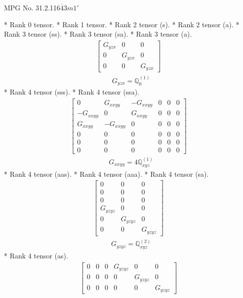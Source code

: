 \documentclass[fleqn,8pt,landscape]{jsarticle}
\begin{document}
\setcounter{MaxMatrixCols}{32}

\renewcommand{\tablename}{Table~}
\renewcommand{\figurename}{Figure~}
\begin{center}
\LARGE
MPG No. 31.2.116\quad$\bar{4}3m1'$
\end{center}
* Rank 0 tensor.
* Rank 1 tensor.
* Rank 2 tensor (s).
* Rank 2 tensor (a).
* Rank 3 tensor (ss).
* Rank 3 tensor (sa).
* Rank 3 tensor (a).
\begin{align*}
\begin{bmatrix} G_{yzx} & 0 & 0 \\ 0 & G_{yzx} & 0 \\ 0 & 0 & G_{yzx} \end{bmatrix}
\end{align*}
\begin{align*}
& G_{yzx} = \mathbb{Q}_{0}^{(1)}
\end{align*}
* Rank 4 tensor (sss).
* Rank 4 tensor (ssa).
\begin{align*}
\begin{bmatrix} 0 & G_{xxyy} & - G_{xxyy} & 0 & 0 & 0 \\ - G_{xxyy} & 0 & G_{xxyy} & 0 & 0 & 0 \\ G_{xxyy} & - G_{xxyy} & 0 & 0 & 0 & 0 \\ 0 & 0 & 0 & 0 & 0 & 0 \\ 0 & 0 & 0 & 0 & 0 & 0 \\ 0 & 0 & 0 & 0 & 0 & 0 \end{bmatrix}
\end{align*}
\begin{align*}
& G_{xxyy} = 4 \mathbb{Q}_{xyz}^{(1)}
\end{align*}
* Rank 4 tensor (aas).
* Rank 4 tensor (aaa).
* Rank 4 tensor (sa).
\begin{align*}
\begin{bmatrix} 0 & 0 & 0 \\ 0 & 0 & 0 \\ 0 & 0 & 0 \\ G_{yzyz} & 0 & 0 \\ 0 & G_{yzyz} & 0 \\ 0 & 0 & G_{yzyz} \end{bmatrix}
\end{align*}
\begin{align*}
& G_{yzyz} = \mathbb{Q}_{xyz}^{(2)}
\end{align*}
* Rank 4 tensor (as).
\begin{align*}
\begin{bmatrix} 0 & 0 & 0 & G_{yzyz} & 0 & 0 \\ 0 & 0 & 0 & 0 & G_{yzyz} & 0 \\ 0 & 0 & 0 & 0 & 0 & G_{yzyz} \end{bmatrix}
\end{align*}
\end{document}
